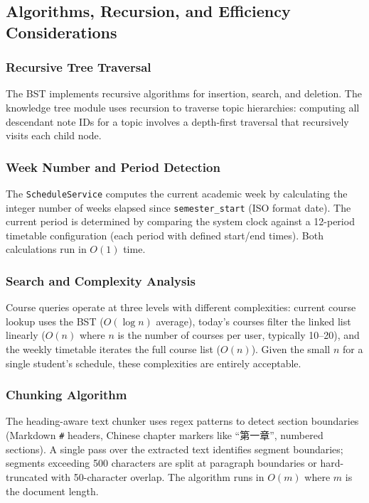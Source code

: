 \documentclass[11pt,a4paper]{article}
\begin{document}
\subsection{Algorithms, Recursion, and Efficiency Considerations}

\subsubsection{Recursive Tree Traversal}
The BST implements recursive algorithms for insertion, search, and deletion. The knowledge tree module uses recursion to traverse topic hierarchies: computing all descendant note IDs for a topic involves a depth-first traversal that recursively visits each child node.

\subsubsection{Week Number and Period Detection}
The \texttt{ScheduleService} computes the current academic week by calculating the integer number of weeks elapsed since \texttt{semester\_start} (ISO format date). The current period is determined by comparing the system clock against a 12-period timetable configuration (each period with defined start/end times). Both calculations run in $O(1)$ time.

\subsubsection{Search and Complexity Analysis}
Course queries operate at three levels with different complexities: current course lookup uses the BST ($O(\log n)$ average), today's courses filter the linked list linearly ($O(n)$ where $n$ is the number of courses per user, typically 10--20), and the weekly timetable iterates the full course list ($O(n)$). Given the small $n$ for a single student's schedule, these complexities are entirely acceptable.

\subsubsection{Chunking Algorithm}
The heading-aware text chunker uses regex patterns to detect section boundaries (Markdown \texttt{\#} headers, Chinese chapter markers like ``第一章'', numbered sections). A single pass over the extracted text identifies segment boundaries; segments exceeding 500 characters are split at paragraph boundaries or hard-truncated with 50-character overlap. The algorithm runs in $O(m)$ where $m$ is the document length.
\end{document}
